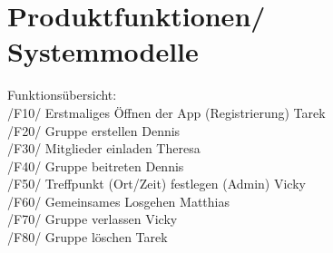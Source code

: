 \section{Produktfunktionen/ Systemmodelle}
Funktionsübersicht: \\
/F10/ Erstmaliges Öffnen der App (Registrierung) Tarek \\
/F20/ Gruppe erstellen Dennis \\
/F30/ Mitglieder einladen Theresa \\
/F40/ Gruppe beitreten Dennis \\
/F50/ Treffpunkt (Ort/Zeit) festlegen (Admin) Vicky \\
/F60/ Gemeinsames Losgehen Matthias \\
/F70/ Gruppe verlassen Vicky \\
/F80/ Gruppe löschen Tarek \\


